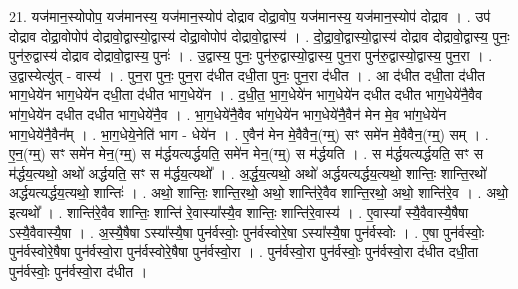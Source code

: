 \documentclass[17pt]{extarticle}
\begin{document}
21. यज॑मान॒स्योपोप॒ यज॑मानस्य॒ यज॑मान॒स्योप॑ दोद्राव दोद्रा॒वोप॒ यज॑मानस्य॒ यज॑मान॒स्योप॑ दोद्राव । . उप॑ दोद्राव दोद्रा॒वोपोप॑ दोद्रावो॒द्वास्यो॒द्वास्य॑ दोद्रा॒वोपोप॑ दोद्रावो॒द्वास्य॑ । . दो॒द्रा॒वो॒द्वास्यो॒द्वास्य॑ दोद्राव दोद्रावो॒द्वास्य॒ पुनः॒ पुन॑रु॒द्वास्य॑ दोद्राव दोद्रावो॒द्वास्य॒ पुनः॑ । . उ॒द्वास्य॒ पुनः॒ पुन॑रु॒द्वास्यो॒द्वास्य॒ पुन॒रा पुन॑रु॒द्वास्यो॒द्वास्य॒ पुन॒रा । . उ॒द्वास्येत्यु॑त् - वास्य॑ । . पुन॒रा पुनः॒ पुन॒रा द॑धीत दधी॒ता पुनः॒ पुन॒रा द॑धीत । . आ द॑धीत दधी॒ता द॑धीत भाग॒धेये॑न भाग॒धेये॑न दधी॒ता द॑धीत भाग॒धेये॑न । . द॒धी॒त॒ भा॒ग॒धेये॑न भाग॒धेये॑न दधीत दधीत भाग॒धेये॑नै॒वैव भा॑ग॒धेये॑न दधीत दधीत भाग॒धेये॑नै॒व । . भा॒ग॒धेये॑नै॒वैव भा॑ग॒धेये॑न भाग॒धेये॑नै॒वैन॑ मेन मे॒व भा॑ग॒धेये॑न भाग॒धेये॑नै॒वैन᳚म् । . भा॒ग॒धेये॒नेति॑ भाग - धेये॑न । . ए॒वैन॑ मेन मे॒वैवैन॒(ग्म्॒) सꣳ समे॑न मे॒वैवैन॒(ग्म्॒) सम् । . ए॒न॒(ग्म्॒) सꣳ समे॑न मेन॒(ग्म्॒) स म॑र्द्धयत्यर्द्धयति॒ समे॑न मेन॒(ग्म्॒) स म॑र्द्धयति । . स म॑र्द्धयत्यर्द्धयति॒ सꣳ स म॑र्द्धय॒त्यथो॒ अथो॑ अर्द्धयति॒ सꣳ स म॑र्द्धय॒त्यथो᳚ । . अ॒र्द्ध॒य॒त्यथो॒ अथो॑ अर्द्धयत्यर्द्धय॒त्यथो॒ शान्तिः॒ शान्ति॒रथो॑ अर्द्धयत्यर्द्धय॒त्यथो॒ शान्तिः॑ । . अथो॒ शान्तिः॒ शान्ति॒रथो॒ अथो॒ शान्ति॑रे॒वैव शान्ति॒रथो॒ अथो॒ शान्ति॑रे॒व । . अथो॒ इत्यथो᳚ । . शान्ति॑रे॒वैव शान्तिः॒ शान्ति॑ रे॒वास्या᳚स्यै॒व शान्तिः॒ शान्ति॑रे॒वास्य॑ । . ए॒वास्या᳚ स्यै॒वैवास्यै॒षैषा ऽस्यै॒वैवास्यै॒षा । . अ॒स्यै॒षैषा ऽस्या᳚स्यै॒षा पुन॑र्वस्वोः॒ पुन॑र्वस्वोरे॒षा ऽस्या᳚स्यै॒षा पुन॑र्वस्वोः । . ए॒षा पुन॑र्वस्वोः॒ पुन॑र्वस्वोरे॒षैषा पुन॑र्वस्वो॒रा पुन॑र्वस्वोरे॒षैषा पुन॑र्वस्वो॒रा । . पुन॑र्वस्वो॒रा पुन॑र्वस्वोः॒ पुन॑र्वस्वो॒रा द॑धीत दधी॒ता पुन॑र्वस्वोः॒ पुन॑र्वस्वो॒रा द॑धीत । \newline
\end{document}
